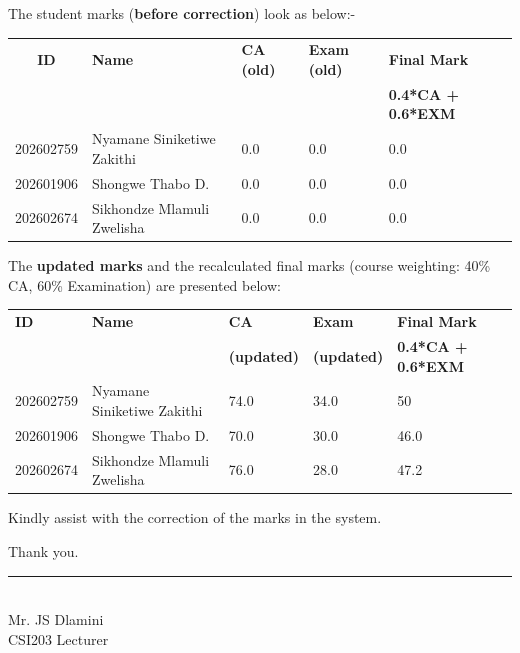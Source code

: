 \documentclass[12pt]{letter}
\begin{document}
The student marks (\textbf{before correction}) look as below:-
\begin{center}
\begin{tabular}{|c|l|l|l|l|}
\hline
\textbf{ID} & \textbf{Name} & \textbf{CA (old)} & \textbf{Exam (old)} & \textbf{Final Mark} \\

  &    &   &   & \textbf{0.4*CA + 0.6*EXM} \\

\hline
202602759 & Nyamane Siniketiwe Zakithi   & 0.0 & 0.0 & 0.0 \\
\hline
202601906 & Shongwe Thabo D.              & 0.0 & 0.0 & 0.0 \\
\hline
202602674 & Sikhondze Mlamuli Zwelisha    & 0.0 & 0.0 & 0.0 \\
\hline
\end{tabular}
\end{center}

The \textbf{updated marks }and the recalculated final marks (course weighting: 40\% CA, 60\% Examination) are presented below:

\begin{center}
\begin{tabular}{|l|l|l|l|l|}
\hline
\textbf{ID} & \textbf{Name} & \textbf{CA} & \textbf{Exam} & \textbf{Final Mark } \\
  &     & \textbf{(updated)} & \textbf{(updated)}  &  \textbf{0.4*CA + 0.6*EXM}\\

\hline
202602759 & Nyamane Siniketiwe Zakithi   & 74.0 & 34.0 & 50 \\
\hline
202601906 & Shongwe Thabo D.              & 70.0 & 30.0 & 46.0 \\
\hline
202602674 & Sikhondze Mlamuli Zwelisha    & 76.0 & 28.0 & 47.2 \\
\hline
\end{tabular}
\end{center}


Kindly assist with the correction of the marks in the system.

\vspace{0.5cm}

Thank you.

\vspace{1cm}

\noindent
\rule{6cm}{0.4pt} \\ 
Mr. JS Dlamini \\
CSI203 Lecturer
\end{document}
